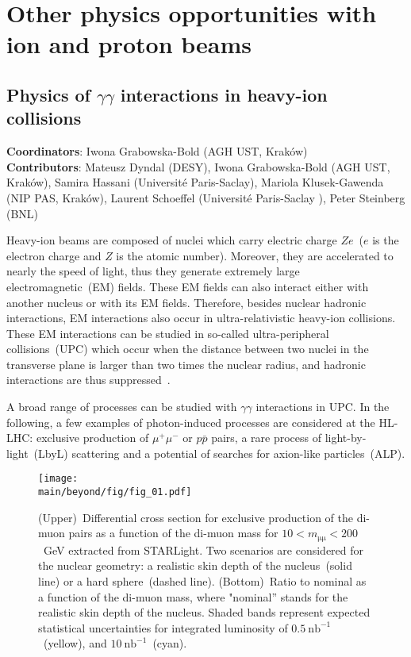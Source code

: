 \documentclass[../report.tex]{subfiles}
\providecommand{\main}{..}
\begin{document}
\section{Other physics opportunities with ion and proton beams}


\subsection{Physics of $\gamma \gamma$ interactions in heavy-ion collisions}
\label{sec:gammagamma}
\textbf{Coordinators}:  Iwona Grabowska-Bold (AGH UST, Krak\'ow)\\
\textbf{Contributors}: Mateusz Dyndal (DESY), Iwona Grabowska-Bold (AGH UST, Krak\'ow), Samira Hassani (Universit\'e Paris-Saclay), Mariola Klusek-Gawenda (NIP PAS, Krak\'ow), Laurent Schoeffel (Universit\'e Paris-Saclay ), Peter Steinberg (BNL)



Heavy-ion beams are composed of nuclei which carry electric charge $Ze$~($e$ is the electron charge and $Z$ is the atomic number). Moreover, they are accelerated to nearly the speed of light, thus they generate extremely large electromagnetic~(EM) fields. These EM fields can also interact either with another nucleus or with its EM fields.
Therefore, besides nuclear hadronic interactions, EM
interactions also occur in ultra-relativistic heavy-ion collisions.
These EM interactions can be studied in so-called ultra-peripheral
collisions~(UPC) which occur when the distance between two nuclei in the transverse plane is larger than two times the nuclear radius, and hadronic interactions are thus suppressed~\cite{Bertulani:2005ru}.

A broad range of processes can be studied with $\gamma\gamma$ interactions in UPC. In the following, a few examples of photon-induced processes are considered at the HL-LHC: exclusive production of $\mu^+\mu^-$ or $p\bar{p}$ pairs, a rare process of light-by-light~(LbyL) scattering and a potential of searches for axion-like particles~(ALP).

\begin{figure}[!hbt]
\centering
\texttt{[image: \\main/beyond/fig/fig\_01.pdf]}
\caption{
(Upper)~Differential cross section for exclusive production of the di-muon pairs as a function of the di-muon mass for
$10<m_{\mathrm{\mu\mu}}<200$~GeV extracted from STARLight. Two
scenarios are considered for the nuclear geometry: a realistic skin
depth of the nucleus~(solid line) or a hard sphere~(dashed
line). (Bottom)~Ratio to nominal as a function of the di-muon mass,
where "nominal'' stands for the realistic skin depth of the nucleus.
 Shaded bands represent expected statistical uncertainties for integrated luminosity of $0.5~\mathrm{nb}^{-1}$~(yellow), and $10~\mathrm{nb}^{-1}$~(cyan).}
\label{fig:mumu}
\end{figure}
\end{document}
